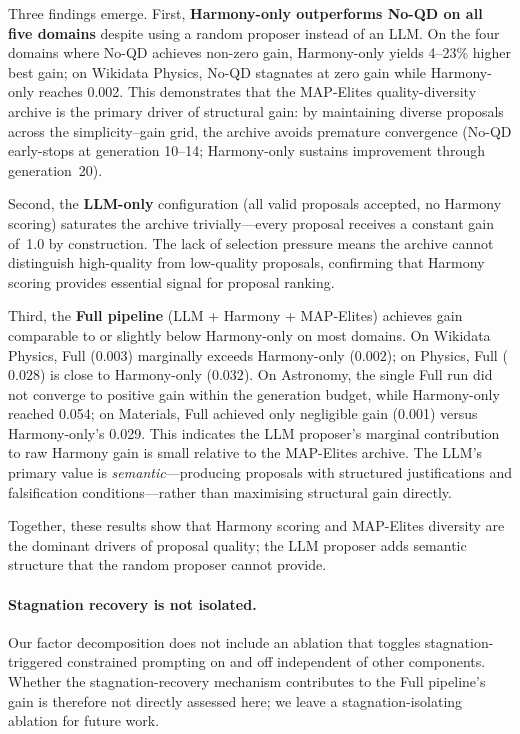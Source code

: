 Three findings emerge.  First, \textbf{Harmony-only outperforms No-QD on all
five domains} despite using a random proposer instead of an LLM.  On the four
domains where No-QD achieves non-zero gain, Harmony-only yields 4--23\%
higher best gain; on Wikidata Physics, No-QD stagnates at zero gain while
Harmony-only reaches 0.002.  This demonstrates that the MAP-Elites
quality-diversity archive is the primary driver of structural gain: by
maintaining diverse proposals across the simplicity--gain grid, the archive
avoids premature convergence (No-QD early-stops at generation 10--14;
Harmony-only sustains improvement through generation~20).

Second, the \textbf{LLM-only} configuration (all valid proposals accepted,
no Harmony scoring) saturates the archive trivially---every proposal receives
a constant gain of~1.0 by construction.  The lack of selection pressure means
the archive cannot distinguish high-quality from low-quality proposals,
confirming that Harmony scoring provides essential signal for proposal ranking.

Third, the \textbf{Full pipeline} (LLM + Harmony + MAP-Elites) achieves
gain comparable to or slightly below Harmony-only on most domains.  On
Wikidata Physics, Full ($0.003$) marginally exceeds Harmony-only ($0.002$);
on Physics, Full ($0.028$) is close to Harmony-only ($0.032$).  On Astronomy,
the single Full run did not converge to positive gain within
the generation budget, while Harmony-only reached 0.054; on Materials,
Full achieved only negligible gain (0.001) versus Harmony-only's 0.029.
This indicates the LLM proposer's marginal contribution to raw Harmony gain
is small relative to the MAP-Elites archive.  The LLM's primary value is
\emph{semantic}---producing proposals with structured justifications and
falsification conditions---rather than maximising structural gain directly.

Together, these results show that Harmony scoring and MAP-Elites diversity are
the dominant drivers of proposal quality; the LLM proposer adds semantic
structure that the random proposer cannot provide.

\paragraph{Stagnation recovery is not isolated.}
Our factor decomposition does not include an ablation that toggles
stagnation-triggered constrained prompting on and off independent of
other components.  Whether the stagnation-recovery mechanism
contributes to the Full pipeline's gain is therefore not directly
assessed here; we leave a stagnation-isolating ablation for future work.


